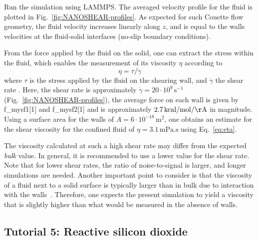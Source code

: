 \documentclass[9pt,tutorial]{livecoms}
\newcommand{\lmpcmd}[1]{\hspace{0pt}\colorbox{listing}{\textcolor{command}{\small{#1}}}\hspace{0pt}} %
\begin{document}
Run the simulation using LAMMPS.  The averaged velocity
profile for the fluid is plotted in Fig.~\ref{fig:NANOSHEAR-profiles}.
As expected for such Couette flow geometry, the fluid velocity increases
linearly along $z$, and is equal to the walls velocities at the fluid-solid
interfaces (no-slip boundary conditions).

From the force applied by the fluid on the solid, one can extract the stress
within the fluid, which enables the measurement of its viscosity $\eta$
according to
\begin{equation}
\eta = \tau / \dot{\gamma}
\label{eq:eta}
\end{equation}
where $\tau$ is the stress applied by
the fluid on the shearing wall, and $\dot{\gamma}$ the shear rate
\cite{gravelle2021violations}.  Here, the shear rate is
approximately $\dot{\gamma} = 20 \cdot 10^9\,\text{s}^{-1}$ (Fig.~\ref{fig:NANOSHEAR-profiles}),
the average force on each wall is given by \lmpcmd{f\_mysf1[1]} and \lmpcmd{f\_mysf2[1]}
and is approximately $2.7\,\mathrm{kcal/mol/\AA{}}$ in magnitude.  Using a surface area
for the walls of $A = 6 \cdot 10^{-18}\,\text{m}^2$, one obtains an estimate for
the shear viscosity for the confined fluid of $\eta = 3.1\,\text{mPa.s}$ using Eq.~\eqref{eq:eta}.

\begin{note}
The viscosity calculated at such a high shear rate may differ from the expected
\emph{bulk} value.  In general, it is recommended to use a lower value for the
shear rate.  Note that for lower shear rates, the ratio of noise-to-signal is
larger, and longer simulations are needed.  Another important point to consider
is that the viscosity of a fluid next to a solid surface is typically larger
than in bulk due to interaction with the walls~\cite{wolde-kidanInterplayInterfacialViscosity2021}.
Therefore, one expects the present simulation to yield a viscosity that is slightly
higher than what would be measured in the absence of walls.
\end{note}

\subsection{Tutorial 5: Reactive silicon dioxide}
\label{reactive-silicon-dioxide-label}
\end{document}
